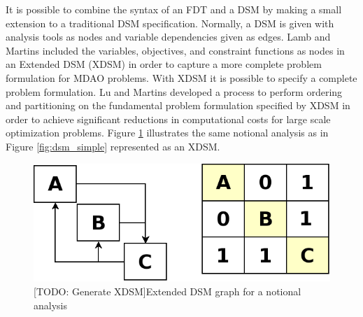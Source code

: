     It is possible to combine the syntax of an FDT and a DSM by making a small extension to a traditional DSM specification. Normally, a DSM is given 
    with analysis tools as nodes and variable dependencies given as edges. Lamb and Martins included the variables, objectives, and constraint functions
    as nodes in an Extended DSM (XDSM)\cite{Lambe2012} in order to capture a more complete problem formulation for MDAO problems. With XDSM 
    it is possible to specify a complete problem formulation. Lu and Martins developed a process to perform ordering and partitioning on the fundamental 
    problem formulation specified by XDSM in order to achieve significant reductions in computational costs for large scale optimization problems. 
    Figure \ref{fig:dsm_full} illustrates the same notional analysis as in Figure \ref{fig:dsm_simple} represented as an XDSM.

    \begin{figure}[!hbp]
        \begin{center}
        \includegraphics[width=.75\textwidth]{images/dsm_simple}
        \caption{[TODO: Generate XDSM]Extended DSM graph for a notional analysis \label{fig:dsm_full}}
        \end{center}
    \end{figure}